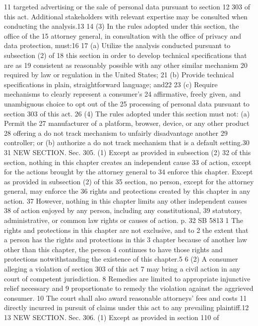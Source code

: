 11 targeted advertising or the sale of personal data pursuant to section
12 303 of this act. Additional stakeholders with relevant expertise may
be consulted when conducting the analysis.13
14 (3) In the rules adopted under this section, the office of the
15 attorney general, in consultation with the office of privacy and data
protection, must:16
17 (a) Utilize the analysis conducted pursuant to subsection (2) of
18 this section in order to develop technical specifications that are as
19 consistent as reasonably possible with any other similar mechanism
20 required by law or regulation in the United States;
21 (b) Provide technical specifications in plain, straightforward
language; and22
23 (c) Require mechanisms to clearly represent a consumer's
24 affirmative, freely given, and unambiguous choice to opt out of the
25 processing of personal data pursuant to section 303 of this act.
26 (4) The rules adopted under this section must not: (a) Permit the
27 manufacturer of a platform, browser, device, or any other product
28 offering a do not track mechanism to unfairly disadvantage another
29 controller; or (b) authorize a do not track mechanism that is a
default setting.30
31 NEW SECTION. Sec. 305. (1) Except as provided in subsection (2)
32 of this section, nothing in this chapter creates an independent cause
33 of action, except for the actions brought by the attorney general to
34 enforce this chapter. Except as provided in subsection (2) of this
35 section, no person, except for the attorney general, may enforce the
36 rights and protections created by this chapter in any action.
37 However, nothing in this chapter limits any other independent causes
38 of action enjoyed by any person, including any constitutional,
39 statutory, administrative, or common law rights or causes of action.
p. 32 SB 5813
1 The rights and protections in this chapter are not exclusive, and to
2 the extent that a person has the rights and protections in this
3 chapter because of another law other than this chapter, the person
4 continues to have those rights and protections notwithstanding the
existence of this chapter.5
6 (2) A consumer alleging a violation of section 303 of this act
7 may bring a civil action in any court of competent jurisdiction.
8 Remedies are limited to appropriate injunctive relief necessary and
9 proportionate to remedy the violation against the aggrieved consumer.
10 The court shall also award reasonable attorneys' fees and costs
11 directly incurred in pursuit of claims under this act to any
prevailing plaintiff.12
13 NEW SECTION. Sec. 306. (1) Except as provided in section 110 of
